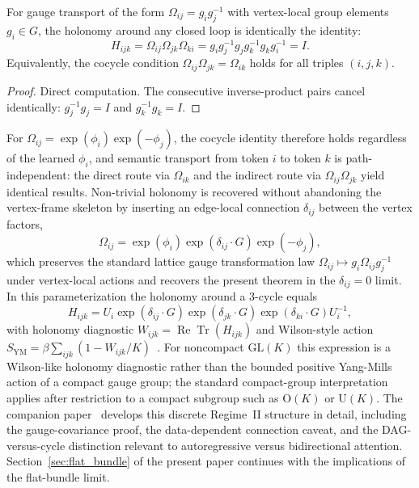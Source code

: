 \documentclass[twoside,11pt]{article}
\begin{document}
\begin{lemma}
\label{thm:vanishing_holonomy}
For gauge transport of the form $\Omega_{ij} = g_i g_j^{-1}$ with vertex-local group elements $g_i \in G$, the holonomy around any closed loop is identically the identity:
\begin{equation}
H_{ijk} = \Omega_{ij} \Omega_{jk} \Omega_{ki}
 = g_i g_j^{-1} g_j g_k^{-1} g_k g_i^{-1}
 = I.
\label{eq:holonomy}
\end{equation}
Equivalently, the cocycle condition $\Omega_{ij} \Omega_{jk} = \Omega_{ik}$ holds for all triples $(i,j,k)$.
\end{lemma}

\begin{proof}
Direct computation. The consecutive inverse-product pairs cancel identically: $g_j^{-1} g_j = I$ and $g_k^{-1} g_k = I$.
\end{proof}

For $\Omega_{ij} = \exp(\phi_i)\exp(-\phi_j)$, the cocycle identity therefore holds regardless of the learned $\phi_i$, and semantic transport from token $i$ to token $k$ is path-independent: the direct route via $\Omega_{ik}$ and the indirect route via $\Omega_{ij} \Omega_{jk}$ yield identical results. Non-trivial holonomy is recovered without abandoning the vertex-frame skeleton by inserting an edge-local connection $\delta_{ij}$ between the vertex factors,
\begin{equation}
\Omega_{ij} = \exp(\phi_i) \exp(\delta_{ij}\cdot G) \exp(-\phi_j),
\label{eq:edge_relaxed_omega_glk}
\end{equation}
which preserves the standard lattice gauge transformation law $\Omega_{ij} \mapsto g_i \Omega_{ij} g_j^{-1}$ under vertex-local actions and recovers the present theorem in the $\delta_{ij}=0$ limit. In this parameterization the holonomy around a 3-cycle equals
\begin{equation}
H_{ijk} = U_i \exp(\delta_{ij}\cdot G) \exp(\delta_{jk}\cdot G) \exp(\delta_{ki}\cdot G) U_i^{-1},
\end{equation}
with holonomy diagnostic $W_{ijk} = \operatorname{Re}\operatorname{Tr}(H_{ijk})$ and Wilson-style action $S_{\mathrm{YM}} = \beta\sum_{ijk}(1 - W_{ijk}/K)$~\citep{WilsonConfinement1974,KogutSusskind1975,Creutz1983}. For noncompact $\mathrm{GL}(K)$ this expression is a Wilson-like holonomy diagnostic rather than the bounded positive Yang-Mills action of a compact gauge group; the standard compact-group interpretation applies after restriction to a compact subgroup such as $\mathrm{O}(K)$ or $\mathrm{U}(K)$. The companion paper~\cite{Dennis2025it} develops this discrete Regime~II structure in detail, including the gauge-covariance proof, the data-dependent connection caveat, and the DAG-versus-cycle distinction relevant to autoregressive versus bidirectional attention. Section~\ref{sec:flat_bundle} of the present paper continues with the implications of the flat-bundle limit.
\end{document}
